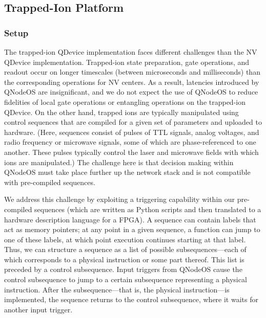 \subsection{Trapped-Ion Platform}
\label{sec:trapped-ion-platform}

\subsubsection{Setup}

The trapped-ion \ac{QDevice} implementation faces different challenges than the \ac{NV} \ac{QDevice} implementation. Trapped-ion state preparation, gate operations, and readout occur on longer timescales (between microseconds and milliseconds) than the corresponding operations for \ac{NV} centers. As a result, latencies introduced by \ac{QNodeOS} are insignificant, and we do not expect the use of \ac{QNodeOS} to reduce fidelities of local gate operations or entangling operations on the trapped-ion \ac{QDevice}. On the other hand, trapped ions are typically manipulated using control sequences that are compiled for a given set of parameters and uploaded to hardware. (Here, sequences consist of pulses of \ac{TTL} signals, analog voltages, and radio frequency or microwave signals, some of which are phase-referenced to one another. These pulses typically control the laser and microwave fields with which ions are manipulated.) The challenge here is that decision making within \ac{QNodeOS} must take place further up the network stack and is not compatible with pre-compiled sequences.

We address this challenge by exploiting a triggering capability within our pre-compiled sequences (which are written as Python scripts and then translated to a hardware description language for a \ac{FPGA}). A sequence can contain labels that act as memory pointers; at any point in a given sequence, a function can jump to one of these labels, at which point execution continues starting at that label. Thus, we can structure a sequence as a list of possible subsequences---each of which corresponds to a physical instruction or some part thereof. This list is preceded by a control subsequence. Input triggers from \ac{QNodeOS} cause the control subsequence to jump to a certain subsequence representing a physical instruction. After the subsequence---that is, the physical instruction---is implemented, the sequence returns to the control subsequence, where it waits for another input trigger.

